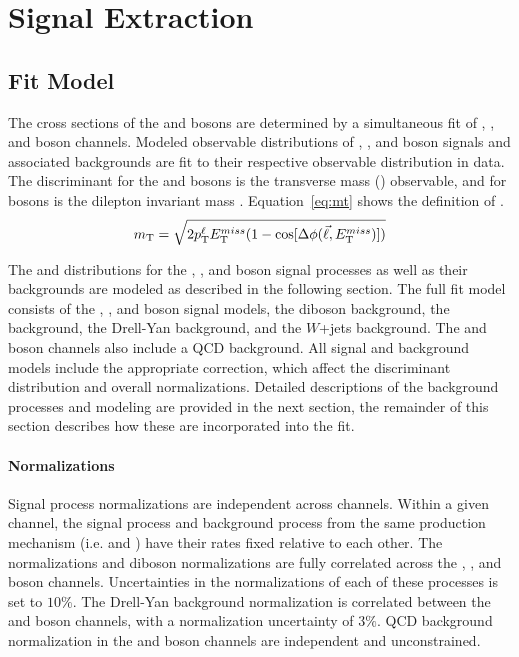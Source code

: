 \chapter{Signal Extraction}\label{ch:sig}
\section{Fit Model}\label{ch:sig:fit}
The cross sections of the \Wpm and \Z bosons are determined by a simultaneous fit of \Wp, \Wm, and \Z boson channels. Modeled observable distributions of \Wp, \Wm, and \Z boson signals and associated backgrounds are fit to their respective observable distribution in data. The discriminant for the \Wp and \Wm bosons is the transverse mass (\mt) observable, and for \Z bosons is the dilepton invariant mass \mll. Equation~\ref{eq:mt} shows the definition of \mt.
\begin{equation}
m_{\mathrm{T}} = \sqrt{ 2 p_{\mathrm{T}}^{\ell} E_{\mathrm{T}}^{miss} ( 1 - \cos[\Delta\phi( {\vec \ell},E_{\mathrm{T}}^{miss} ) ] ) }
\label{eq:mt}
\end{equation}

The \mll and \mt distributions for the \Wp, \Wm, and \Z boson signal processes as well as their backgrounds are modeled as described in the following section. 
The full fit model consists of the \Wp, \Wm, and \Z boson signal models, the diboson background, the \ttbar background, the Drell-Yan background, and the $W$+jets background. The \Wp and \Wm boson channels also include a QCD background. All signal and background models include the appropriate correction, which affect the discriminant distribution and overall normalizations. Detailed descriptions of the background processes and modeling are provided in the next section, the remainder of this section describes how these are incorporated into the  fit. 
\subsubsection{Normalizations}
Signal process normalizations are independent across channels. Within a given channel, the signal process and background process from the same production mechanism (i.e. \wmunu and \wtau) have their rates fixed relative to each other. The \ttbar normalizations and diboson normalizations are fully correlated across the \Wp, \Wm, and \Z boson channels. Uncertainties in the normalizations of each of these processes is set to $10\%$. The Drell-Yan background normalization is correlated between the \Wp and \Wm boson channels, with a normalization uncertainty of $3\%$. QCD background normalization in the \Wp and \Wm boson channels are independent and unconstrained.


